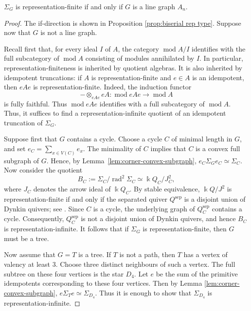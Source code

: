 \documentclass[a4paper,leqno]{amsart}
\begin{document}


\begin{thm}\label{thm:rep-finite}
$\Sigma_G$ is representation-finite if and only if $G$ is a line graph $A_n$.
\end{thm}

\begin{proof}
The if-direction is shown in Proposition \ref{prop:biserial rep type}.
Suppose now that $G$ is not a line graph.

Recall first that, for every ideal $I$ of $A$, the category $\operatorname{mod} A/I$ identifies with the full subcategory of $\operatorname{mod} A$ consisting of modules annihilated by $I$. In particular, representation-finiteness is inherited by quotient algebras. It is also inherited by idempotent truncations: if $A$ is
representation-finite and $e\in A$ is an idempotent, then $eAe$ is
representation-finite. Indeed, the induction functor
$$-\otimes_{eAe}eA:\operatorname{mod}eAe\longrightarrow
\operatorname{mod}A$$
is fully faithful. Thus $\operatorname{mod}eAe$ identifies with a full subcategory of $\operatorname{mod}A$. Thus, it suffices to find a representation-infinite quotient of an idempotent truncation of $\Sigma_G$.

Suppose first that $G$ contains a cycle. Choose a cycle $C$ of minimal
length in $G$, and set $e_C=\sum_{x\in V(C)}e_x$. The minimality of $C$ implies that $C$ is a convex full subgraph of $G$. Hence, by
Lemma~\ref{lem:corner-convex-subgraph}, $e_C\Sigma_Ge_C\simeq \Sigma_C$. Now consider the quotient
$$B_C:=\Sigma_C/\operatorname{rad}^2\Sigma_C\simeq \Bbbk Q_C/J_C^2,$$
where $J_C$ denotes the arrow ideal of $\Bbbk Q_C$.
By stable equivalence, $\Bbbk Q/J^2$ is representation-finite if and
only if the separated quiver $Q^{\operatorname{sep}}$ is a disjoint
union of Dynkin quivers; see \cite[Section~X.2]{ARS95}. Since $C$ is a
cycle, the underlying graph of $Q_C^{\operatorname{sep}}$ contains a
cycle. Consequently, $Q_C^{\operatorname{sep}}$ is not a disjoint union of Dynkin quivers, and hence $B_C$ is representation-infinite. It follows that if $\Sigma_G$ is representation-finite, then $G$ must be a tree.

Now assume that $G=T$ is a tree. If $T$ is not a path, then $T$ has a vertex of valency at least $3$. Choose three distinct neighbours of such a vertex. The full subtree on these four vertices is the star $D_4$. Let $e$ be the sum of the primitive idempotents corresponding to these four vertices. Then by Lemma \ref{lem:corner-convex-subgraph}, $e\Sigma_Te\simeq \Sigma_{D_4}$. Thus it is enough to show that $\Sigma_{D_4}$ is representation-infinite. 


\end{proof}
\end{document}
